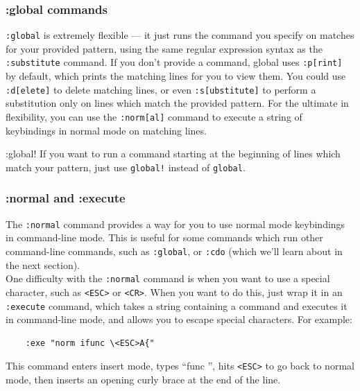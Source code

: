 \documentclass{beamer}
\begin{document}
\begin{frame}[fragile]
    \frametitle{:global commands}
    \small
    \verb+:global+ is extremely flexible --- it just runs the command you specify on matches for your provided pattern, using the same regular expression syntax as the \verb+:substitute+ command. If you don't provide a command, global uses \verb+:p[rint]+ by default, which prints the matching lines for you to view them. You could use \verb+:d[elete]+ to delete matching lines, or even \verb+:s[ubstitute]+ to perform a substitution only on lines which match the provided pattern. For the ultimate in flexibility, you can use the \verb+:norm[al]+ command to execute a string of keybindings in normal mode on matching lines.\\
    \vspace{0.5cm}
    \begin{block}{:global!}
	If you want to run a command starting at the beginning of lines which match your pattern, just use \verb+global!+ instead of \verb+global+.
    \end{block}
\end{frame}

\begin{frame}[fragile]
    \frametitle{:normal and :execute}
    \small
    The \verb+:normal+ command provides a way for you to use normal mode keybindings in command-line mode. This is useful for some commands which run other command-line commands, such as \verb+:global+, or \verb+:cdo+ (which we'll learn about in the next section).\\
    \vspace{0.5cm}
    One difficulty with the \verb+:normal+ command is when you want to use a special character, such as \verb+<ESC>+ or \verb+<CR>+. When you want to do this, just wrap it in an \verb+:execute+ command, which takes a string containing a command and executes it in command-line mode, and allows you to escape special characters. For example:\\
    \begin{verbatim}
    :exe "norm ifunc \<ESC>A{"
    \end{verbatim}
    This command enters insert mode, types \enquote{func }, hits \verb+<ESC>+ to go back to normal mode, then inserts an opening curly brace at the end of the line.
\end{frame}
\end{document}
